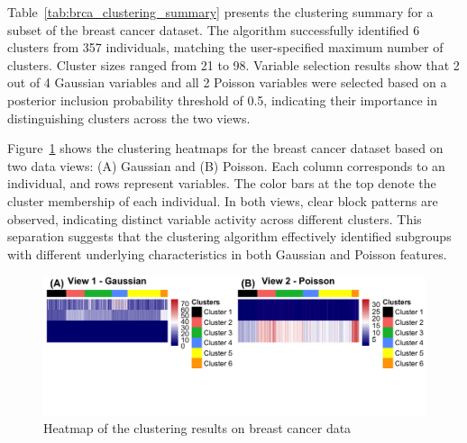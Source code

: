 Table~\ref{tab:brca_clustering_summary} presents the clustering summary for a subset of the breast cancer dataset. 
The algorithm successfully identified 6 clusters from 357 individuals, matching the user-specified maximum number of clusters. 
Cluster sizes ranged from 21 to 98. Variable selection results show that 2 out of 4 Gaussian variables and all 2 Poisson variables were selected based on a posterior inclusion probability threshold of 0.5, 
indicating their importance in distinguishing clusters across the two views.

Figure~\ref{fig:breast_cancer_heatmap} shows the clustering heatmaps for the breast cancer dataset based on two data views: 
(A) Gaussian and (B) Poisson. Each column corresponds to an individual, and rows represent variables.
 The color bars at the top denote the cluster membership of each individual. In both views, clear block patterns are observed,
  indicating distinct variable activity across different clusters. This separation suggests that the clustering algorithm effectively 
  identified subgroups with different underlying characteristics in both Gaussian and Poisson features.

\begin{figure}
    \centering
    \includegraphics[width=0.9\linewidth]{../results/hamp_real_data.png}
    \caption{Heatmap of the clustering results on breast cancer data}
    \label{fig:breast_cancer_heatmap}
\end{figure}